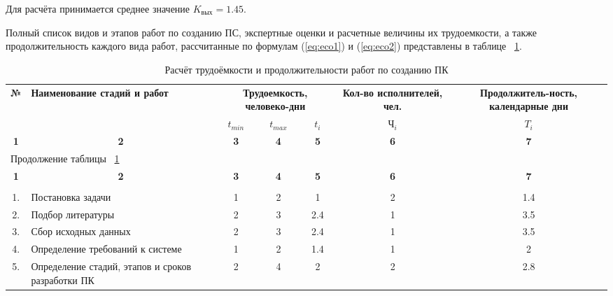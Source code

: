 Для расчёта принимается среднее значение ${K_{\mbox{вых}} = 1.45}$. 

Полный список видов и этапов работ по созданию ПС, экспертные оценки и расчетные величины их трудоемкости,
а также продолжительность каждого вида работ, рассчитанные по формулам (\ref{eq:eco1}) и (\ref{eq:eco2}) представлены
в таблице ~\ref{tab:eco2}.

\begin{center}
\begin{longtable}{|c|p{3.5cm}|c|c|c|c|c|}
\caption{Расчёт трудоёмкости и продолжительности работ по созданию ПК} \label{tab:eco2} \\ \hline
\multicolumn{1}{|c|}{\textbf{№}} & \multicolumn{1}{p{3.5cm}|}{\textbf{Наименование стадий и  работ}} & 
\multicolumn{3}{p{3.5cm}|}{\textbf{Трудоемкость, человеко-дни}} &   \multicolumn{1}{p{3cm}|}{\textbf{Кол-во исполнителей, чел.}} &
\multicolumn{1}{p{3.8cm}|}{\textbf{Продолжитель-ность, календарные дни}} \\
\cline{3-7}

\multicolumn{1}{|c|}{} &   \multicolumn{1}{c|}{} & 
\multicolumn{1}{|c|}{${t_{min}}$} & \multicolumn{1}{c|}{${t_{max}}$} & 
\multicolumn{1}{|c|}{ ${t_i}$ } &   \multicolumn{1}{c|}{ ${\mbox{Ч}_i}$ } & 
\multicolumn{1}{c|}{ ${T_i}$ } \\ \hline

\multicolumn{1}{|c|}{\textbf{1}} &   \multicolumn{1}{c|}{\textbf{2}} & 
\multicolumn{1}{|c|}{\textbf{3}} &   \multicolumn{1}{c|}{\textbf{4}} & 
\multicolumn{1}{|c|}{\textbf{5}} &   \multicolumn{1}{c|}{\textbf{6}} & 
\multicolumn{1}{c|}{\textbf{7}} \\ \hline
\endfirsthead

\multicolumn{7}{|l|}{{Продолжение таблицы ~\ref{tab:eco2}}} \\ %
\hline
\multicolumn{1}{|c|}{\textbf{1}} &   \multicolumn{1}{c|}{\textbf{2}} & 
\multicolumn{1}{c|}{\textbf{3}} & \multicolumn{1}{c|}{\textbf{4}} & 
\multicolumn{1}{|c|}{\textbf{5}} &   \multicolumn{1}{c|}{\textbf{6}} & 
\multicolumn{1}{c|}{\textbf{7}} \\ \hline
\endhead

\endfoot

\hline
\endlastfoot

\multicolumn{7}{|c|}{\textbf{Техническое задание}} \\ \hline

1. & Постановка задачи & 1 & 2 & 1 & 2 & 1.4 \\ \hline
2. & Подбор литературы & 2 & 3 & 2.4 & 1 & 3.5 \\ \hline
3. & Сбор исходных данных & 2 & 3 & 2.4 & 1 & 3.5 \\ \hline
4. & Определение требований к системе & 1 & 2 & 1.4 & 1 & 2 \\ \hline
5. & Определение стадий, этапов и сроков разработки ПК
	& 2 & 4 & 2 & 2 & 2.8 \\ \hline


\end{longtable}
\end{center}
